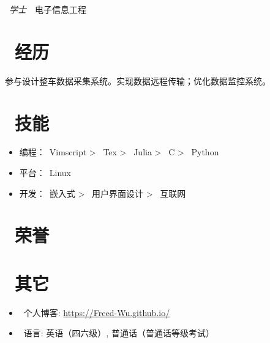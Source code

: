 \documentclass[../main]{subfiles}
\begin{document}
%
\label{sub:zh_njust}

\faGraduationCap\ \emph{学士}\ \faBolt\ 电子信息工程

\section{\faUsers\ 经历}%
\label{sub:zh_experience}

%
\label{sub:zh_fsae}

参与设计整车数据采集系统。实现数据远程传输；优化数据监控系统。

%
\label{sub:zh_school}


\section{\faCogs\ 技能}%
\label{sec:zh_skills}

\begin{itemize}
  \item 编程：\faVimeo\ Vimscript > \faFile\ Tex >
        \faDraftingCompass\ Julia > \faCuttlefish\ C > \faPython\ Python
  \item 平台：\faLinux\ Linux
  \item 开发：\faMicrochip\ 嵌入式 > \faFile\ 用户界面设计 > \faGlobeAsia\ 互联网
\end{itemize}

\section{\faHeart\ 荣誉}%
\label{sec:zh_honors}


\section{\faInfo\ 其它}%
\label{sec:zh_miscellaneous}

\begin{itemize}
  \item\faBlog\ 个人博客: \url{https://Freed-Wu.github.io/}
  \item\faLanguage\ 语言: 英语（四六级）, 普通话（普通话等级考试）
\end{itemize}
\end{document}
